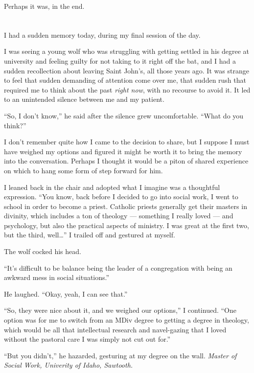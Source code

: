 Perhaps it was, in the end.

\section{}

I had a sudden memory today, during my final session of the day.

I was seeing a young wolf who was struggling with getting settled in his degree at university and feeling guilty for not taking to it right off the bat, and I had a sudden recollection about leaving Saint John's, all those years ago. It was strange to feel that sudden demanding of attention come over me, that sudden rush that required me to think about the past \emph{right now}, with no recourse to avoid it. It led to an unintended silence between me and my patient.

``So, I don't know,'' he said after the silence grew uncomfortable. ``What do you think?''

I don't remember quite how I came to the decision to share, but I suppose I must have weighed my options and figured it might be worth it to bring the memory into the conversation. Perhaps I thought it would be a piton of shared experience on which to hang some form of step forward for him.

I leaned back in the chair and adopted what I imagine was a thoughtful expression. ``You know, back before I decided to go into social work, I went to school in order to become a priest. Catholic priests generally get their masters in divinity, which includes a ton of theology --- something I really loved --- and psychology, but also the practical aspects of ministry. I was great at the first two, but the third, well\ldots{}'' I trailed off and gestured at myself.

The wolf cocked his head.

``It's difficult to be balance being the leader of a congregation with being an awkward mess in social situations.''

He laughed. ``Okay, yeah, I can see that.''

``So, they were nice about it, and we weighed our options,'' I continued. ``One option was for me to switch from an MDiv degree to getting a degree in theology, which would be all that intellectual research and navel-gazing that I loved without the pastoral care I was simply not cut out for.''

``But you didn't,'' he hazarded, gesturing at my degree on the wall. \emph{Master of Social Work, Univerity of Idaho, Sawtooth.}

